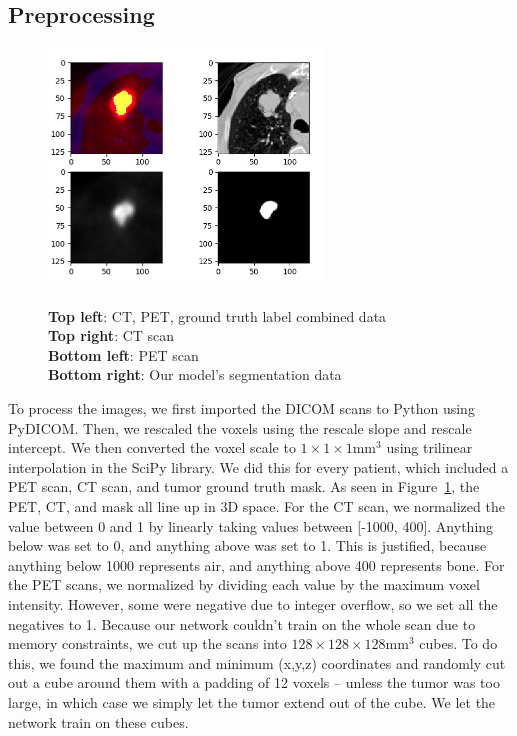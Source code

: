 \documentclass[12pt, letterpaper]{article}
\begin{document}
	\subsection{Preprocessing}
	\begin{figure}[h]
		\centering
		\includegraphics[width=0.65\textwidth]{img/segment.png}
		\caption[caption]{\\\hspace{\textwidth}\textbf{Top left}: CT, PET, ground truth label combined data\\\hspace{\textwidth}\textbf{Top right}: CT scan\\\hspace{\textwidth}\textbf{Bottom left}: PET scan\\\hspace{\textwidth}\textbf{Bottom right}: Our model's segmentation data}
		\label{fig:segment}
	\end{figure}
To process the images, we first imported the DICOM scans to Python using PyDICOM. Then, we rescaled the voxels using the rescale slope and rescale intercept. We then converted the voxel scale to $1\times1\times1\si{\milli\meter\cubed}$ using trilinear interpolation in the SciPy library. We did this for every patient, which included a PET scan, CT scan, and tumor ground truth mask. As seen in Figure~\ref{fig:segment}, the PET, CT, and mask all line up in 3D space. For the CT scan, we normalized the value between 0 and 1 by linearly taking values between [-1000, 400]. Anything below was set to 0, and anything above was set to 1. This is justified, because anything below 1000 represents air, and anything above 400 represents bone. For the PET scans, we normalized by dividing each value by the maximum voxel intensity. However, some were negative due to integer overflow, so we set all the negatives to 1. Because our network couldn’t train on the whole scan due to memory constraints, we cut up the scans into $128\times128\times128\si{\milli\meter\cubed}$ cubes. To do this, we found the maximum and minimum (x,y,z) coordinates and randomly cut out a cube around them with a padding of 12 voxels -- unless the tumor was too large, in which case we simply let the tumor extend out of the cube. We let the network train on these cubes.
\end{document}
